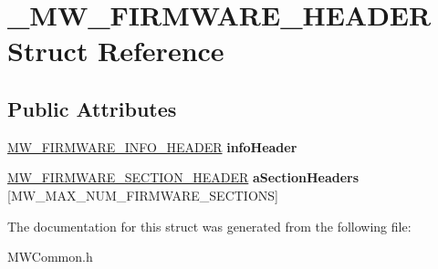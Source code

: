\hypertarget{struct__MW__FIRMWARE__HEADER}{\section{\-\_\-\-M\-W\-\_\-\-F\-I\-R\-M\-W\-A\-R\-E\-\_\-\-H\-E\-A\-D\-E\-R Struct Reference}
\label{struct__MW__FIRMWARE__HEADER}
}
\subsection*{Public Attributes}
\begin{DoxyCompactItemize}
\item 
\hypertarget{struct__MW__FIRMWARE__HEADER_a8aef706d289effb22621bd28d9c44174}{\hyperlink{struct__MW__FIRMWARE__INFO__HEADER}{M\-W\-\_\-\-F\-I\-R\-M\-W\-A\-R\-E\-\_\-\-I\-N\-F\-O\-\_\-\-H\-E\-A\-D\-E\-R} {\bfseries info\-Header}}\label{struct__MW__FIRMWARE__HEADER_a8aef706d289effb22621bd28d9c44174}

\item 
\hypertarget{struct__MW__FIRMWARE__HEADER_ad71214eded7bc3719c1a97f5d3932039}{\hyperlink{struct__MW__FIRMWARE__SECTION__HEADER}{M\-W\-\_\-\-F\-I\-R\-M\-W\-A\-R\-E\-\_\-\-S\-E\-C\-T\-I\-O\-N\-\_\-\-H\-E\-A\-D\-E\-R} {\bfseries a\-Section\-Headers} \mbox{[}M\-W\-\_\-\-M\-A\-X\-\_\-\-N\-U\-M\-\_\-\-F\-I\-R\-M\-W\-A\-R\-E\-\_\-\-S\-E\-C\-T\-I\-O\-N\-S\mbox{]}}\label{struct__MW__FIRMWARE__HEADER_ad71214eded7bc3719c1a97f5d3932039}

\end{DoxyCompactItemize}


The documentation for this struct was generated from the following file\-:\begin{DoxyCompactItemize}
\item 
M\-W\-Common.\-h\end{DoxyCompactItemize}
